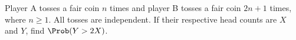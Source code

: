 Player A tosses a fair coin $n$ times and player B tosses a fair coin $2n+1$ times, where $n\ge1$. All tosses are independent. If their respective head counts are $X$ and $Y$, find $\Prob(Y>2X)$.

